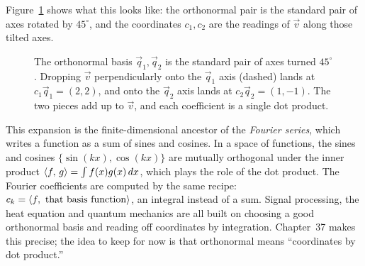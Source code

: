 Figure~\ref{ch17:tilted-grid} shows what this looks like: the orthonormal pair is the
standard pair of axes rotated by $45^\circ$, and the coordinates $c_1,c_2$ are the readings of $\vec v$
along those tilted axes.

\begin{figure}[htbp]
\centering
{}
\caption{The orthonormal basis $\vec q_1,\vec q_2$ is the standard pair of axes turned $45^\circ$.
Dropping $\vec v$ perpendicularly onto the $\vec q_1$ axis (dashed) lands at $c_1\vec q_1=(2,2)$,
and onto the $\vec q_2$ axis lands at $c_2\vec q_2=(1,-1)$. The two pieces add up to $\vec v$, and
each coefficient is a single dot product.}
\label{ch17:tilted-grid}
\end{figure}

\begin{connectionbox}
This expansion is the finite-dimensional ancestor of the \emph{Fourier series}, which writes a
function as a sum of sines and cosines. In a space of functions, the sines and cosines
$\{\sin(kx),\cos(kx)\}$ are mutually orthogonal under the inner product
$\langle f,\, g \rangle=\int f(x)g(x)\,dx$, which plays the role of the dot product. The Fourier coefficients
are computed by the same recipe: $c_k = \langle f,\, \,\text{that basis function} \rangle$, an integral
instead of a sum. Signal processing, the heat equation and quantum mechanics are all built on
choosing a good orthonormal basis and reading off coordinates by integration. Chapter~37
makes this precise; the idea to keep for now is that orthonormal means
``coordinates by dot product.''
\end{connectionbox}

